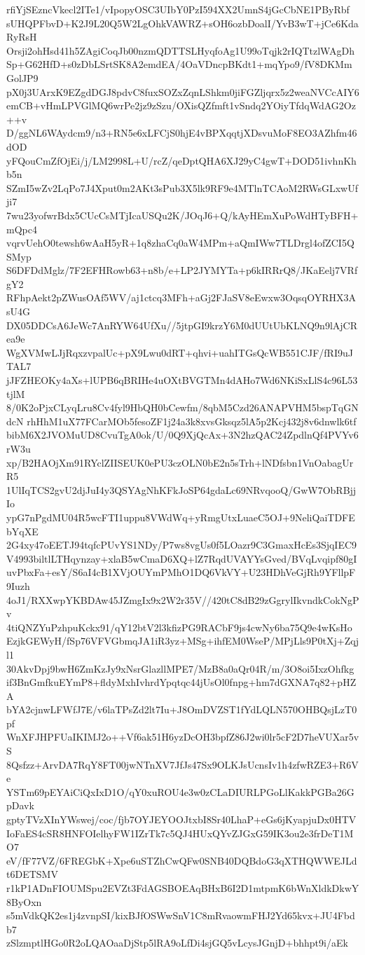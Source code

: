 rfiYjSEzncVkecl2ITe1/vIpopyOSC3UIbY0PzI594XX2UmnS4jGcCbNE1PByRbf
sUHQPFbvD+K2J9L20Q5W2LgOhkVAWRZ+sOH6ozbDoalI/YvB3wT+jCe6KdaRyRsH
Orsji2ohHsd41h5ZAgiCoqJb00nzmQDTTSLHyqfoAg1U99oTqjk2rIQTtzlWAgDh
Sp+G62HfD+s0zDbLSrtSK8A2emdEA/4OaVDncpBKdt1+mqYpo9/fV8DKMmGolJP9
pX0j3UArxK9EZgdDGJ8pdvC8fuxSOZxZqnLShkm0jiFGZljqrx5z2weaNVCcAIY6
emCB+vHmLPVGlMQ6wrPe2jz9zSzu/OXisQZfmft1vSndq2YOiyTfdqWdAG2Oz++v
D/ggNL6WAydcm9/n3+RN5e6xLFCjS0hjE4vBPXqqtjXDsvuMoF8EO3AZhfm46dOD
yFQouCmZfOjEi/j/LM2998L+U/rcZ/qeDptQHA6XJ29yC4gwT+DOD51ivhnKhb5n
SZmI5wZv2LqPo7J4Xput0m2AKt3sPub3X5lk9RF9e4MTlnTCAoM2RWsGLxwUfji7
7wu23yofwrBdx5CUcCsMTjIcaUSQu2K/JOqJ6+Q/kAyHEmXuPoWdHTyBFH+mQpc4
vqrvUehO0tewsh6wAaH5yR+1q8zhaCq0aW4MPm+aQmIWw7TLDrgl4ofZCI5QSMyp
S6DFDdMglz/7F2EFHRowb63+n8b/e+LP2JYMYTa+p6kIRRrQ8/JKaEelj7VRfgY2
RFhpAekt2pZWusOAf5WV/aj1ctcq3MFh+aGj2FJaSV8eEwxw3OqsqOYRHX3AsU4G
DX05DDCsA6JeWc7AnRYW64UfXu//5jtpGI9krzY6M0dUUtUbKLNQ9n9lAjCRea9e
WgXVMwLJjRqxzvpalUc+pX9Lwu0dRT+qhvi+uahITGsQcWB551CJF/fRI9uJTAL7
jJFZHEOKy4aXs+lUPB6qBRIHe4uOXtBVGTMn4dAHo7Wd6NKiSxLlS4c96L53tjlM
8/0K2oPjxCLyqLru8Cv4fyl9HbQH0bCewfm/8qbM5Czd26ANAPVHM5bspTqGNdcN
rhHhM1uX77FCarMOb5fesoZF1j24a3k8xvsGksqz5lA5p2Kcj432j8v6dnwlk6tf
bibM6X2JVOMuUD8CvuTgA0ok/U/0Q9XjQcAx+3N2hzQAC24ZpdlnQf4PVYv6rW3u
xp/B2HAOjXm91RYclZIISEUK0ePU3czOLN0bE2n5sTrh+lNDfsbn1VnOabagUrR5
1UlIqTCS2gvU2djJuI4y3QSYAgNhKFkJoSP64gdaLc69NRvqooQ/GwW7ObRBjjIo
ypG7nPgdMU04R5wcFTI1uppu8VWdWq+yRmgUtxLuaeC5OJ+9NeliQaiTDFEbYqXE
2G4xy47oEETJ94tqfcPUvYS1NDy/P7ws8vgUs0f5LOazr9C3GmaxHcEs3SjqIEC9
V4993biltlLTHqynzay+xlaB5wCmaD6XQ+lZ7RqdUVAYYsGved/BVqLvqipf80gI
uvPbxFa+esY/S6aI4cB1XVjOUYmPMhO1DQ6VkVY+U23HDhVeGjRh9YFllpF9Iuzh
4oJ1/RXXwpYKBDAw45JZmgIx9x2W2r35V//420tC8dB29zGgrylIkvndkCokNgPv
4tiQNZYuPzhpuKckx91/qY12btV2l3kfizPG9RACbF9js4cwNy6ba75Q9e4wKsHo
EzjkGEWyH/fSp76VFVGbmqJA1iR3yz+MSg+ihfEM0WseP/MPjLls9P0tXj+Zqjl1
30AkvDpj9bwH6ZmKzJy9xNsrGlazllMPE7/MzB8a0aQr04R/m/3O8oi5IxzOhfkg
if3BnGmfkuEYmP8+fldyMxhIvhrdYpqtqc44jUsOl0fnpg+hm7dGXNA7q82+pHZA
bYA2cjnwLFWfJ7E/v6laTPsZd2lt7Iu+J8OmDVZST1fYdLQLN570OHBQsjLzT0pf
WnXFJHPFUaIKIMJ2o++Vf6ak51H6yzDcOH3bpfZ86J2wi0lr5cF2D7heVUXar5vS
8Qsfzz+ArvDA7RqY8FT00jwNTnXV7JfJs47Sx9OLKJsUcnsIv1h4zfwRZE3+R6Ve
YSTm69pEYAiCiQxIxD1O/qY0xuROU4e3w0zCLaDIURLPGoLlKakkPGBa26GpDavk
gptyTVzXInYWswej/coc/fjb7OYJEYOOJtxbI8Sr40LhaP+eGs6jKyapjuDx0HTV
IoFaES4cSR8HNFOIelhyFW1IZrTk7c5QJ4HUxQYvZJGxG59IK3ou2e3frDeT1MO7
eV/fF77VZ/6FREGbK+Xpe6uSTZhCwQFw0SNB40DQBdoG3qXTHQWWEJLdt6DETSMV
r1kP1ADnFIOUMSpu2EVZt3FdAGSBOEAqBHxB6I2D1mtpmK6bWnXldkDkwY8ByOxn
s5mVdkQK2es1j4zvnpSI/kixBJfOSWwSnV1C8mRvaowmFHJ2Yd65kvx+JU4Fbdb7
zSlzmptlHGo0R2oLQAOaaDjStp5lRA9oLfDi4sjGQ5vLcysJGnjD+bhhpt9i/aEk
